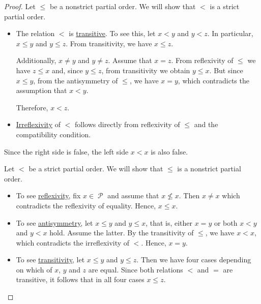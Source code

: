 \begin{proof}
   Let \( \leq \) be a nonstrict partial order. We will show that \( < \) is a strict partial order.

  \begin{itemize}
    \item The relation \( < \) is \hyperref[def:binary_relation/transitive]{transitive}. To see this, let \( x < y \) and \( y < z \). In particular, \( x \leq y \) and \( y \leq z \). From transitivity, we have \( x \leq z \).

    Additionally, \( x \neq y \) and \( y \neq z \). Assume that \( x = z \). From reflexivity of \( \leq \) we have \( z \leq x \) and, since \( y \leq z \), from transitivity we obtain \( y \leq x \). But since \( x \leq y \), from the antisymmetry of \( \leq \), we have \( x = y \), which contradicts the assumption that \( x < y \).

    Therefore, \( x < z \).

    \item \hyperref[def:binary_relation/irreflexive]{Irreflexivity} of \( < \) follows directly from reflexivity of \( \leq \) and the compatibility condition.
  \end{itemize}

  Since the right side is false, the left side \( x < x \) is also false.

   Let \( < \) be a strict partial order. We will show that \( \leq \) is a nonstrict partial order.

  \begin{itemize}
    \item To see \hyperref[def:binary_relation/reflexive]{reflexivity}, fix \( x \in \mscrP \) and assume that \( x \not\leq x \). Then \( x \neq x \) which contradicts the reflexivity of equality. Hence, \( x \leq x \).

    \item To see \hyperref[def:binary_relation/antisymmetric]{antisymmetry}, let \( x \leq y \) and \( y \leq x \), that is, either \( x = y \) or both \( x < y \) and \( y < x \) hold. Assume the latter. By the transitivity of \( \leq \), we have \( x < x \), which contradicts the irreflexivity of \( < \). Hence, \( x = y \).

    \item To see \hyperref[def:binary_relation/transitive]{transitivity}, let \( x \leq y \) and \( y \leq z \). Then we have four cases depending on which of \( x \), \( y \) and \( z \) are equal. Since both relations \( < \) and \( = \) are transitive, it follows that in all four cases \( x \leq z \).
  \end{itemize}
\end{proof}

